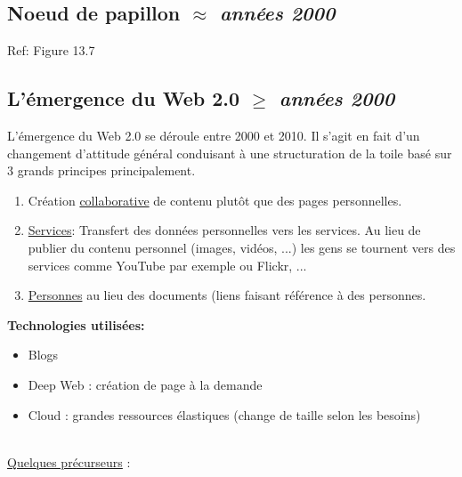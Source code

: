 \documentclass{article}
\begin{document}
\subsection{Noeud de papillon \textit{ $\approx$ années 2000}}
Ref: Figure 13.7


\subsection{L'émergence du Web 2.0  \textit{$\ge$ années 2000}}
L'émergence du Web 2.0 se déroule entre 2000 et 2010. Il s'agit en fait d'un changement d'attitude général conduisant à une structuration de la toile basé sur 3 grands principes principalement. \\
\begin{enumerate}
    \item Création \underline{collaborative} de contenu plutôt que des pages personnelles.
    
    \item \underline{Services}: Transfert des données personnelles vers les services. Au lieu de publier du contenu personnel (images, vidéos, ...) les gens se tournent vers des services comme YouTube par exemple ou Flickr, ...
    \item \underline{Personnes} au lieu des documents (liens faisant référence à des personnes.
\end{enumerate} 

\vspace * {0.3cm}
\begin{minipage}{15cm}
\textbf{Technologies utilisées:}
    \begin{itemize}
        \item Blogs 
        \item Deep Web : création de page à la demande 
        \item Cloud : grandes ressources élastiques (change de taille                      selon les besoins) 
    \end{itemize}
\end{minipage}

\vspace{0.5cm}       

\newpage

\hline 
\vspace * {0.5cm}
    \\
    
    \underline{Quelques précurseurs} :
    
\end{document}
